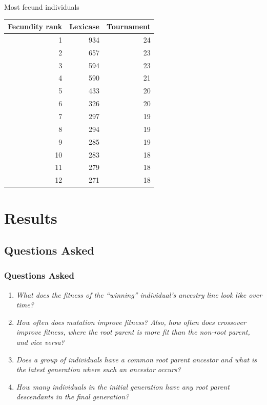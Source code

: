 \documentclass{beamer}
\begin{document}
\begin{frame}{Most fecund individuals}
		\begin{center}
			\begin{tabular}{rrr}
				Fecundity rank & Lexicase & Tournament \\
				\hline\noalign{\smallskip}
				1 & 934 & 24 \\
				2 & 657 & 23 \\
				3 & 594 & 23 \\
				4 & 590 & 21 \\
				5 & 433 & 20 \\
				6 & 326 & 20 \\
				7 & 297 & 19 \\
				8 & 294 & 19 \\
				9 & 285 & 19 \\
				10 & 283 & 18 \\
				11 & 279 & 18 \\
				12 & 271 & 18 \\
			\end{tabular}
		\end{center}
\end{frame}

\section[Results]{Results}

\subsection[Questions Asked]{Questions Asked}

\begin{frame}
\frametitle{Questions Asked}
\begin{enumerate}
\item \emph{What does the fitness of the ``winning'' individual's ancestry line look like over time?}
\item \emph{How often does mutation improve fitness? Also, how often does crossover improve fitness, where the root parent is more fit than the non-root parent, and vice versa?}
\item \emph{Does a group of individuals have a common root parent ancestor and what is the latest generation where such an ancestor occurs?}
\item \emph{How many individuals in the initial generation have any root parent descendants in the final generation?}
\end{enumerate}
\end{frame}
\end{document}
